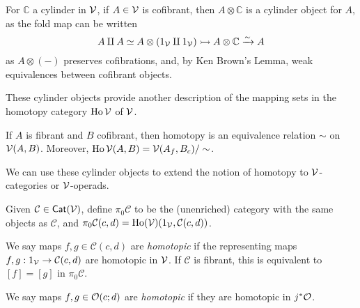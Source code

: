 \documentclass[a4paper,10pt
,draft
]{article}%
\renewcommand{\1}{\eta}%
\begin{document}

\begin{remark}
      \label{CYL_REM}
      For $\mathbb C$ a cylinder in $\mathcal V$,
      if $A \in \mathcal V$ is cofibrant, then $A \otimes \mathbb C$ is a cylinder object for $A$,
      as the fold map can be written
      \begin{equation}
            A \amalg A \simeq A \otimes (1_{\mathcal V} \amalg 1_{\mathcal V}) \rightarrowtail A \otimes \mathbb C \xrightarrow{\sim} A
      \end{equation}
      as $A \otimes (-)$ preserves cofibrations, and, by Ken Brown's Lemma, weak equivalences between cofibrant objects.
\end{remark}

These cylinder objects provide another description of the mapping sets in the homotopy category $\operatorname{Ho} \mathcal V$ of $\mathcal V$.

\begin{proposition}       
      If $A$ is fibrant and $B$ cofibrant, then
      homotopy is an equivalence relation $\sim$ on $\mathcal V(A,B)$.
      Moreover, 
      $\operatorname{Ho} \mathcal V (A,B) = \mathcal V(A_f, B_c)/\sim$.
\end{proposition}

We can use these cylinder objects to extend the notion of homotopy to $\mathcal V$-categories or $\mathcal V$-operads.

\begin{definition}
      \label{HTPY_DEFN}
      Given $\mathcal C \in \mathsf{Cat}(\mathcal V)$, define $\pi_0 \mathcal C$ to be the (unenriched) category with
      the same objects as $\mathcal C$, and $\pi_0 \mathcal C (c,d) = \operatorname{Ho}(\mathcal V)(1_{\mathcal V}, \mathcal C(c,d))$.

      We say maps $f,g \in \mathcal C(c,d)$ are \textit{homotopic}
      if the representing maps $f,g: 1_{\mathcal V} \to \mathcal C(c,d)$ are homotopic in $\mathcal V$.
      If $\mathcal C$ is fibrant, this is equivalent to $[f] = [g]$ in $\pi_0\mathcal C$.

      We say maps $f,g \in \mathcal{O}(c;d)$ are \textit{homotopic} if they are homotopic in $j^{\**}\O$. 
\end{definition}
\end{document}
